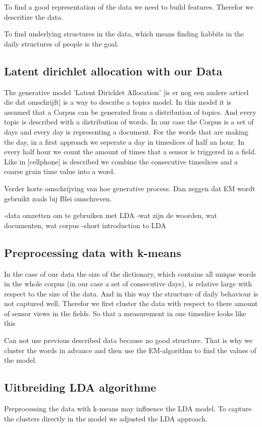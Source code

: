 \documentclass[11pt,a4paper]{report}
\begin{document}
To find a good representation of the data we need to build features. Therefor we descritize the data. 

To find underlying structures in the data, which means finding habbits in the daily structures of people is the goal.


\subsection{Latent dirichlet allocation with our Data}
The generative model 'Latent Dirichlet Allocation' [is er nog een andere articel die dat omschrijft] is a way to describe a topics model. In this model it is assumed that a Corpus can be generated from a distribution of topics. And every topic is described with a distribution of words.
In our case the Corpus is a set of days and every day is representing a document. For the words that are making the day, in a first approach we seperate a day in timeslices of half an hour. In every half hour we count the amount of times that a sensor is triggered in a field. Like in [cellphone] is described we combine the consecutive timeslices and a coarse grain time value into a word.

Verder korte omschrijving van hoe generative process. Dan zeggen dat EM wordt gebruikt zoals bij Blei omschreven.


-data omzetten om te gebruiken met LDA
-wat zijn de woorden, wat documenten, wat corpus
-short introduction to LDA

\subsection{Preprocessing data with k-means}
In the case of our data the size of the dictionary, which contains all unique words in the whole corpus (in our case a set of consecutive days), is relative large with respect to the size of the data. And in this way the structure of daily behaviour is not captured well.
Therefor we first cluster the data with respect to there amount of sensor views in the fields. So that a measurement in one timeslice looks like this


Can not use previous described data because no good structure. That is why we cluster the words in advance and then use the EM-algorithm to find the values of the model.



\subsection{Uitbreiding LDA algorithme}
Preprocessing the data with k-means may influence the LDA model. To capture the clusters directly in the model we adjusted the LDA approach. 
\end{document}
